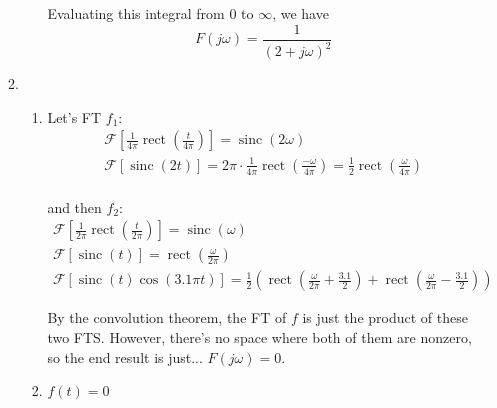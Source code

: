 \documentclass[12pt]{article}
\newcommand{\rect}{\operatorname{rect}}
\newcommand{\sinc}{\operatorname{sinc}}
\begin{document}
\begin{enumerate}
\begin{enumerate}
\begin{enumerate}
                                    Evaluating this integral from $0$ to $\infty$,
                                    we have \[\boxed{F(j\omega)=\frac{1}{(2+j\omega)^2}}\]
                        \end{enumerate}
                  \item \begin{enumerate}
                              \item Let's FT $f_1$:
                                    \begin{gather*}
                                          \mathcal{F}\left[\frac{1}{4\pi}\rect\left(\frac{t}{4\pi}\right)\right]=\sinc(2\omega) \\
                                          \mathcal{F}[\sinc(2t)]=2\pi \cdot \frac{1}{4\pi}\rect\left(\frac{-\omega}{4\pi}\right)=\frac{1}{2}\rect\left(\frac{\omega}{4\pi}\right) \\
                                    \end{gather*}

                                    and then $f_2$:
                                    \begin{gather*}
                                          \mathcal{F}\left[\frac{1}{2\pi}\rect\left(\frac{t}{2\pi}\right)\right]=\sinc(\omega) \\
                                          \mathcal{F}[\sinc(t)]=\rect\left(\frac{\omega}{2\pi}\right) \\
                                          \mathcal{F}[\sinc(t)\cos(3.1\pi t)]=\frac{1}{2}\left(\rect\left(\frac{\omega}{2\pi}+\frac{3.1}{2}\right)+\rect\left(\frac{\omega}{2\pi}-\frac{3.1}{2}\right)\right)
                                    \end{gather*}

                                    By the convolution theorem, the FT of $f$ is just the product of these two FTS.
                                    However, there's no space where both of them are nonzero,
                                    so the end result is just... $\boxed{F(j\omega)=0}$.
                              \item $f(t)=0$
                        \end{enumerate}
            \end{enumerate}
\end{enumerate}
\end{document}
